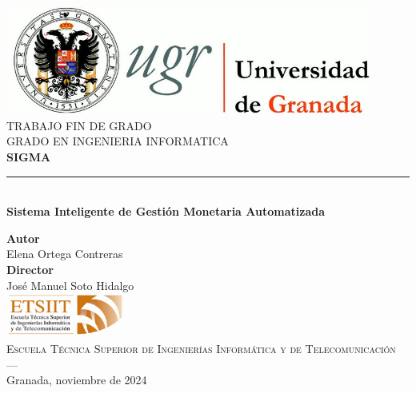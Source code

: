 \begin{titlepage}
    \newlength{\centeroffset}
    \setlength{\centeroffset}{-0.5\oddsidemargin}
    \addtolength{\centeroffset}{0.5\evensidemargin}
    \thispagestyle{empty}
    
    \noindent\hspace*{\centeroffset}
    \begin{minipage}{\textwidth}
    
    \centering
    \includegraphics[width=0.9\textwidth]{logos/logo_ugr.jpg}\\[1.4cm]
    
    \textsc{ \Large TRABAJO FIN DE GRADO\\[0.2cm]}
    \textsc{ GRADO EN INGENIERIA INFORMATICA}\\[1cm]
    
    {\Huge\bfseries SIGMA \\}
    \noindent\rule[-1ex]{\textwidth}{3pt}\\[3.5ex]
    {\large\bfseries Sistema Inteligente de Gestión Monetaria Automatizada }
    \end{minipage}
    
    \vspace{2.5cm}
    \noindent\hspace*{\centeroffset}
    \begin{minipage}{\textwidth}
    \centering
    
    \textbf{Autor}\\ {Elena Ortega Contreras}\\[2.5ex]
    \textbf{Director}\\ {José Manuel Soto Hidalgo}\\[2cm]
    \includegraphics[width=0.3\textwidth]{logos/etsiit_logo.png}\\[0.1cm]
    \textsc{Escuela Técnica Superior de Ingenierías Informática y de Telecomunicación}\\
    \textsc{---}\\
    Granada, noviembre de 2024
    \end{minipage}
    \end{titlepage}